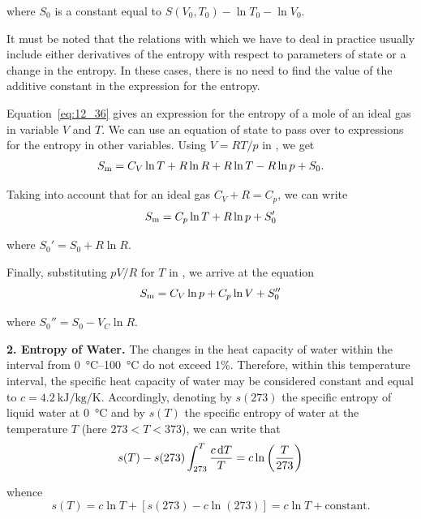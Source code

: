 \noindent
where $S_0$ is a constant equal to $S(V_0,T_0)-\ln{T_0}-\ln{V_0}$.

It must be noted that the relations with which we have to deal in practice usually include either derivatives of the entropy with respect to parameters of state or a change in the entropy. In these cases, there is no need to find the value of the additive constant in the expression for the entropy.

Equation~\eqref{eq:12_36} gives an expression for the entropy of a mole of an ideal gas in variable $V$ and $T$. We can use an equation of state to pass over to expressions for the entropy in other variables. Using $V=RT/p$ in , we get
\begin{equation*}
	S_{\text{m}} = C_V\ln{T} + R\ln{R} + R\ln{T} - R\ln{p} + S_0.
\end{equation*}

\noindent
Taking into account that for an ideal gas $C_V+R=C_p$, we can
write
\begin{equation}\label{eq:12_37}
	S_{\text{m}} = C_p\ln{T} + R\ln{p} + S_0'
\end{equation}

\noindent
where $S_0'=S_0+R\ln{R}$.

Finally, substituting $pV/R$ for $T$ in , we arrive at the equation
\begin{equation}\label{eq:12_38}
	S_{\text{m}} = C_V\ln{p} + C_p\ln{V} + S_0''
\end{equation}

\noindent
where $S_0''=S_0-V_C\ln{R}$.

\textbf{2. Entropy of Water.} The changes in the heat capacity of water within the interval from \SIrange{0}{100}{\degreeCelsius} do not exceed 1\%. Therefore, 	within this temperature interval, the specific heat capacity of water may be considered constant and equal to $c=\SI{4.2}{\kilo\joule\per\kilo\gram\per\kelvin}$. Accordingly, denoting by $s(273)$ the specific entropy of liquid water at \SI{0}{\degreeCelsius} and by $s(T)$ the specific entropy of water at the temperature $T$ (here $273<T<373$), we can write that
\begin{equation*}
	s(T) - s(273) \int_{273}^{T} \frac{c\,\mathrm{d} T}{T} = c\ln\left(\frac{T}{273}\right)
\end{equation*}

\noindent
whence
\begin{equation}\label{eq:12_39}
	s(T) = c\ln{T} + [s(273) - c\ln(273)] = c\ln{T} + \text{constant}.
\end{equation}

